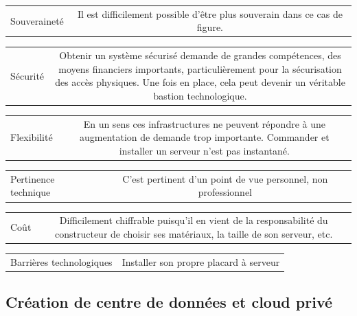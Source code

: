 \documentclass[11pt, a4paper ]{article}
\begin{document}
\begin{spacing}{1.5}
\begin{center}
	\begin{tabular}{| l | c | }
		Souveraineté & Il est difficilement possible d'être plus souverain dans ce cas de figure. \\
	\end{tabular}
	\begin{tabular}{| l | c | }
		Sécurité & Obtenir un système sécurisé demande de grandes compétences, des moyens financiers importants, particulièrement pour la sécurisation des accès physiques. Une fois en place, cela peut devenir un véritable bastion technologique.\\
	\end{tabular}
	\begin{tabular}{| l | c | }
		Flexibilité & En un sens ces infrastructures ne peuvent répondre à une augmentation de demande trop importante. Commander et installer un serveur n'est pas instantané. \\
	\end{tabular}
	\begin{tabular}{| l | c | }
		Pertinence technique & C'est pertinent d'un point de vue personnel, non professionnel \\
	\end{tabular}
	\begin{tabular}{| l | c | }
		Coût & Difficilement chiffrable puisqu'il en vient de la responsabilité du constructeur de choisir ses matériaux, la taille de son serveur, etc.\\
	\end{tabular}
	\begin{tabular}{| l | c | }
		Barrières technologiques & Installer son propre placard à serveur \\
	\end{tabular}
\end{center}

			\subsection{Création de centre de données et cloud privé}





\end{spacing}
\end{document}
